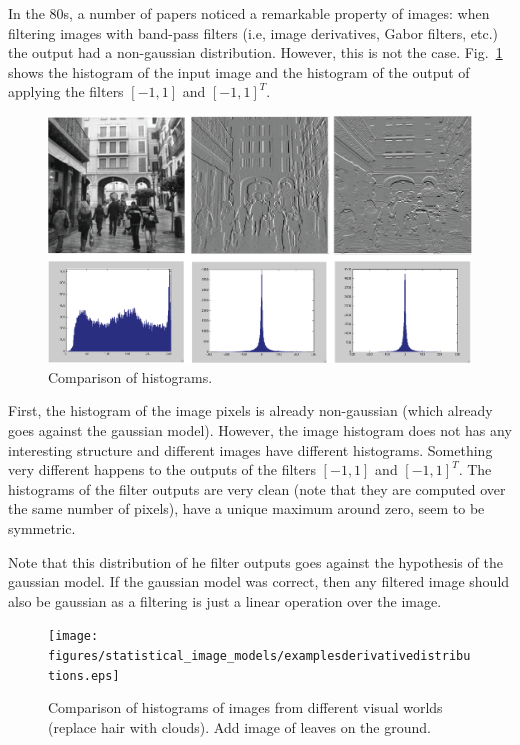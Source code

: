 In the 80s, a number of papers noticed a remarkable property of images: when filtering images with band-pass filters (i.e, image derivatives, Gabor filters, etc.) the output had a non-gaussian distribution.  However, this is not the case. Fig.~\ref{fig:derivativeshist} shows the histogram of the input image and the histogram of the output of applying the filters $\left[-1,1\right]$ and $\left[-1,1\right]^T$.


\begin{figure}[htpb]
\centerline{
\includegraphics[width=1\linewidth]{figures/statistical_image_models/derivativedistribution.eps}
} 
\caption{Comparison of histograms.} 
\label{fig:derivativeshist}
\end{figure}

First, the histogram of the image pixels is already non-gaussian (which already goes against the gaussian model). However, the image histogram does not has any interesting structure and different images have different histograms. Something very different happens to the outputs of the filters  $\left[-1,1\right]$ and $\left[-1,1\right]^T$. The histograms of the filter outputs are very clean (note that they are computed over the same number of pixels), have a unique maximum around zero, seem to be symmetric.

Note that this distribution of he filter outputs goes against the hypothesis of the gaussian model. If the gaussian model was correct, then any filtered image should also be gaussian as a filtering is just a linear operation over the image.

\begin{figure}[htpb]
\centerline{
\texttt{[image: figures/statistical\_image\_models/examplesderivativedistributions.eps]}
} 
\caption{Comparison of histograms of images from different visual worlds (replace hair with clouds). Add image of leaves on the ground.} 
\label{fig:derivativesdistributions}
\end{figure}



